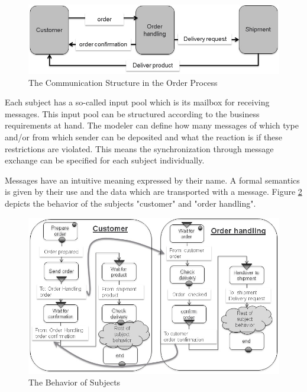 \begin{figure}[htbp]
	\centering
	\includegraphics[width=0.7\linewidth]{Figures/Ontology/SubjectExecution/OrderComStructure}
	\caption[The Communication Structure in the Order Process]{The Communication Structure in the Order Process}
	\label{fig:ordercomstructure1}
\end{figure}

Each subject has a so-called input pool which is its mailbox for receiving messages. This input pool can be structured according to the business requirements at hand. The modeler can define how many messages of which type and/or from which sender can be deposited and what the reaction is if these restrictions are violated. This means the synchronization through message exchange can be specified for each subject individually.

Messages have an intuitive meaning expressed by their name. A formal semantics is given by their use and the data which are transported with a message. Figure \ref{fig:ordercustomerorderhandling} depicts the behavior of the subjects "customer" and "order handling".

\begin{figure}[htbp]
	\centering
	\includegraphics[width=0.9\linewidth]{Figures/Ontology/SubjectExecution/OrderCustomerOrderHandling}
	\caption[The Behavior of Subjects]{The Behavior of Subjects}
	\label{fig:ordercustomerorderhandling}
\end{figure}

